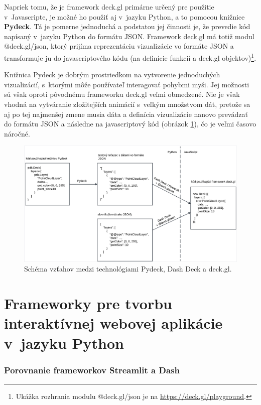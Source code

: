 Napriek tomu, že je framework deck.gl primárne určený pre použitie v~Javascripte, je možné ho použiť aj v~jazyku Python, a to pomocou knižnice \textbf{Pydeck}. Tá je pomerne jednoduchá a podstatou jej činnosti je, že prevedie kód napísaný v~jazyku Python do formátu JSON. Framework deck.gl má totiž modul @deck.gl/json, ktorý prijíma reprezentáciu vizualizácie vo formáte JSON a transformuje ju do javascriptového kódu (na definície funkcií a deck.gl objektov)\footnote{Ukážka rozhrania modulu @deck.gl/json je na \url{https://deck.gl/playground}.}.

Knižnica Pydeck je dobrým prostriedkom na vytvorenie jednoduchých vizualizácií, s~ktorými môže používateľ interagovať pohybmi myši. Jej možnosti sú však oproti pôvodnému frameworku deck.gl veľmi obmedzené. Nie je však vhodná na vytváranie zložitejších animácií s~veľkým množstvom dát, pretože sa aj po tej najmenšej zmene musia dáta a definícia vizualizácie nanovo prevádzať do formátu JSON a následne na javascriptový kód (obrázok \ref{fig:pydeck_dashdeck_schema}), čo je veľmi časovo náročné.

\begin{figure}[h]
    \centering
    \includegraphics[width=1\linewidth]{text_prace/obrazky-figures/pydeck_dashdeck_transformacie.pdf}
    \caption{Schéma vzťahov medzi technológiami Pydeck, Dash Deck a deck.gl.}
    \label{fig:pydeck_dashdeck_schema}
\end{figure}

\section{Frameworky pre tvorbu interaktívnej webovej aplikácie v~jazyku Python}

\subsubsection{Porovnanie frameworkov Streamlit a Dash}

